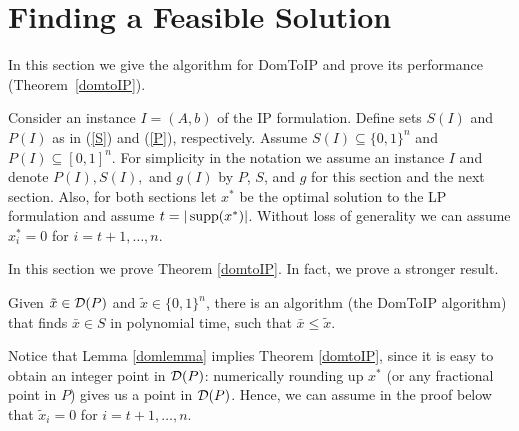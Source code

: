 \section{Finding a Feasible Solution}\label{sec:domTOIP}
In this section we give the algorithm for DomToIP and prove its performance (Theorem~\ref{domtoIP}).

Consider an instance $I=(A,b)$ of the IP formulation. Define sets $S(I)$ and $P(I)$ as in (\ref{S}) and (\ref{P}), respectively. Assume $S(I)\subseteq \{0,1\}^n$ and $P(I)\subseteq [0,1]^n$. For simplicity in the notation we assume an instance $I$ and denote $P(I),S(I),$ and $g(I)$ by $P$, $S$, and $g$ for this section and the next section. Also, for both sections let $x^*$ be the optimal solution to the LP formulation and assume $t=|\operatorname{supp}(x^*)|$. Without loss of generality we can assume $x^*_i = 0$ for $i=t+1,\ldots,n$.

In this section we prove Theorem \ref{domtoIP}. In fact, we prove a stronger result. 
\begin{lemma}\label{domlemma}
	Given $\tilde{x}\in \operatorname{\mathcal{D}}(P)$ and $\tilde{x}\in \{0,1\}^n$, there is an algorithm (the DomToIP algorithm) that finds $\bar{x}\in S$ in polynomial time, such that $\bar{x}\leq \tilde{x}$.\end{lemma}
Notice that Lemma \ref{domlemma} implies Theorem \ref{domtoIP}, since it is easy to obtain an integer point in $\operatorname{\mathcal{D}}(P)$: numerically rounding up $x^*$ (or any fractional point in $P$) gives us a point in $\operatorname{\mathcal{D}}(P)$. Hence, we can assume in the proof below that $\tilde{x}_i= 0$ for $i=t+1,\ldots,n$. 
